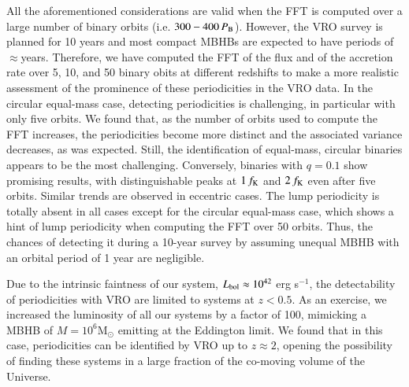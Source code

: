 \documentclass{aa}
\begin{document}
All the aforementioned considerations are valid when the FFT is computed over a large number of binary orbits (i.e. $300-400 \, P_{\rm B}$). However, the VRO survey is planned for 10 years and most compact MBHBs are expected to have periods of $\approx$years. 
Therefore, we have computed the FFT of the flux and of the accretion rate over 5, 10, and 50 binary obits at different redshifts to make a more realistic assessment of the prominence of these periodicities in the VRO data. 
In the circular equal-mass case, detecting periodicities is challenging, in particular with only five orbits. We found that, as the number of orbits used to compute the FFT increases, the periodicities become more distinct and the associated variance decreases, as was expected. Still, the identification of equal-mass, circular binaries appears to be the most challenging.
Conversely, binaries with $q=0.1$ show promising results, with distinguishable peaks at $1\, f_{\rm K}$ and $2 \, f_{\rm K}$ even after five orbits. 
Similar trends are observed in eccentric cases. 
The lump periodicity is totally absent in all cases except for the circular equal-mass case, which shows a hint of lump periodicity when computing the FFT over 50 orbits. Thus, the chances of detecting it during a 10-year survey by assuming unequal MBHB with an orbital period of 1 year are negligible.

Due to the intrinsic faintness of our system, $L_{\rm bol}\approx 10^{42}$ erg s$^{-1}$, the detectability of periodicities with VRO are limited to systems at $z<0.5$.
As an exercise, we increased the luminosity of all our systems by a factor of 100, mimicking a MBHB of $M=10^6$M$_\odot$ emitting at the Eddington limit. We found that in this case, periodicities can be identified by VRO up to $z\approx 2$, opening the possibility of finding these systems in a large fraction of the co-moving volume of the Universe.
\end{document}
